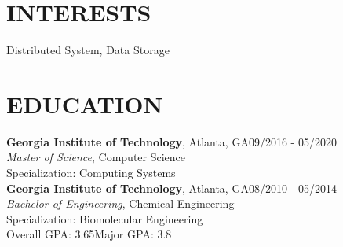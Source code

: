 \documentclass[margin,11pt]{res}
\begin{document}


\address{US Citizen}
\address{mark.x.qi@gmail.com $\bullet$ 404-952-0273}


\begin{resume}
\section{INTERESTS}
Distributed System, Data Storage


\section{EDUCATION}
\textbf{Georgia Institute of Technology}, Atlanta, GA\hfill 09/2016 - 05/2020\\
{\sl Master of Science}, Computer Science\\
Specialization: Computing Systems\\

\textbf{Georgia Institute of Technology}, Atlanta, GA\hfill 08/2010 - 05/2014\\
{\sl Bachelor of Engineering}, Chemical Engineering\\
Specialization: Biomolecular Engineering\\
Overall GPA: 3.65\hspace{10mm}Major GPA: 3.8


\end{resume}
\end{document}
